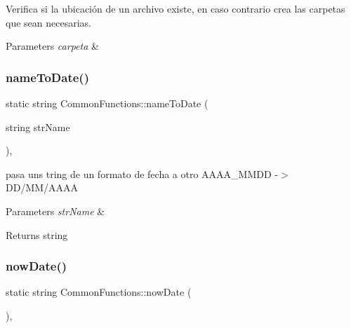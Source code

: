 Verifica si la ubicación de un archivo existe, en caso contrario crea las carpetas que sean necesarias. 


\begin{DoxyParams}{Parameters}
{\em carpeta} & \\
\hline
\end{DoxyParams}
\mbox{\label{classCommonFunctions_a91cd4c4a5cf95a892dd9e117e709b810}} 
\subsubsection{\texorpdfstring{name\+To\+Date()}{nameToDate()}}
{\footnotesize\ttfamily static string Common\+Functions\+::name\+To\+Date (\begin{DoxyParamCaption}\item[{string}]{str\+Name }\end{DoxyParamCaption})\hspace{0.3cm}{\ttfamily [inline]}, {\ttfamily [static]}}



pasa uns tring de un formato de fecha a otro A\+A\+A\+A\+\_\+\+M\+M\+DD -\/$>$ D\+D/\+M\+M/\+A\+A\+AA 


\begin{DoxyParams}{Parameters}
{\em str\+Name} & \\
\hline
\end{DoxyParams}
\begin{DoxyReturn}{Returns}
string 
\end{DoxyReturn}
\mbox{\label{classCommonFunctions_aa8211622807d5dc2721a9c8fe834da79}} 
\subsubsection{\texorpdfstring{now\+Date()}{nowDate()}}
{\footnotesize\ttfamily static string Common\+Functions\+::now\+Date (\begin{DoxyParamCaption}{ }\end{DoxyParamCaption})\hspace{0.3cm}{\ttfamily [inline]}, {\ttfamily [static]}}



